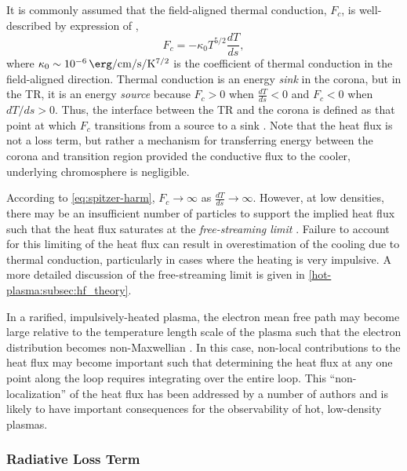 It is commonly assumed that the field-aligned thermal conduction, $F_c$, is well-described by expression of \citet{spitzer_transport_1953},
\begin{equation}\label{eq:spitzer-harm}
    F_c = -\kappa_0 T^{5/2} \frac{dT}{ds},
\end{equation}
where $\kappa_0\sim\SI{e-6}{\erg\per\cm\per\second\per\kelvin\tothe{7/2}}$ is the coefficient of thermal conduction in the field-aligned direction. Thermal conduction is an energy \textit{sink} in the corona, but in the TR, it is an energy \textit{source} because $F_c>0$ when $\frac{dT}{ds}<0$ and $F_c<0$ when $dT/ds>0$. Thus, the interface between the TR and the corona is defined as that point at which $F_c$ transitions from a source to a sink \citep{vesecky_numerical_1979,klimchuk_highly_2008,cargill_enthalpy-based_2012}. Note that the heat flux is not a loss term, but rather a mechanism for transferring energy between the corona and transition region provided the conductive flux to the cooler, underlying chromosphere is negligible.  

According to \autoref{eq:spitzer-harm}, $F_c\to\infty$ as $\frac{dT}{ds}\to\infty$. However, at low densities, there may be an insufficient number of particles to support the implied heat flux such that the heat flux saturates at the \textit{free-streaming limit} \citep{patsourakos_coronal_2005,bradshaw_explosive_2006,bradshaw_collisional_2013}. Failure to account for this limiting of the heat flux can result in overestimation of the cooling due to thermal conduction, particularly in cases where the heating is very impulsive. A more detailed discussion of the free-streaming limit is given in \autoref{hot-plasma:subsec:hf_theory}.

In a rarified, impulsively-heated plasma, the electron mean free path may become large relative to the temperature length scale of the plasma such that the electron distribution becomes non-Maxwellian \citep{bradshaw_collisional_2013}. In this case, non-local contributions to the heat flux may become important such that determining the heat flux at any one point along the loop requires integrating over the entire loop. This ``non-localization'' of the heat flux has been addressed by a number of authors \citep{ljepojevic_heat_1989,karpen_nonlocal_1987,luciani_nonlocal_1983,west_lifetime_2008} and is likely to have important consequences for the observability of hot, low-density plasmas.

\subsubsection{Radiative Loss Term}\label{sec:rad-loss}

